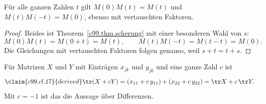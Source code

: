 \begin{fundament}[id=c99.f1,
    titel={Die Scherungen bilden eine Gruppe},
    wozu={Der Kern benutzt nur das Produkt zweier Scherungen; hier wird
      zusammengetragen, was daraus für die ganze Familie folgt.},
    voraussetzung={Kern~\ref{c99.s2.1}, Theorem~\ref{c99.thm.scherung}.},
    zurueck={Jede Scherung $M(t)$ lässt sich durch $M(-t)$ rückgängig machen.}]
  \begin{proposition}\label{c99.prop.gruppe}
    Für alle ganzen Zahlen $t$ gilt $M(0)M(t) = M(t)$ und $M(t)M(-t) = M(0)$,
    ebenso mit vertauschten Faktoren.
  \end{proposition}
  \begin{proof}
    Beides ist Theorem~\ref{c99.thm.scherung} mit einer besonderen Wahl von $s$:
    \begin{equation}\label{c99.eq.gruppe}
      M(0)M(t) = M(0 + t) = M(t),
      \qquad
      M(t)M(-t) = M(t - t) = M(0).
    \end{equation}
    Die Gleichungen mit vertauschten Faktoren folgen genauso, weil $s + t = t + s$.
  \end{proof}
\end{fundament}

\begin{fundament}[id=c99.f2,
    titel={Die Spur respektiert Summen},
    wozu={Die Vertiefung benutzt, dass die Spur einer Differenz die Differenz der
      Spuren ist; hier steht die Rechnung.},
    voraussetzung={\defref{T1}.},
    zurueck={Aus $\tr(AB) = \tr(BA)$ folgt deshalb $\tr(AB - BA) = 0$.}]
  Für Matrizen $X$ und $Y$ mit Einträgen $x_{jk}$ und $y_{jk}$ und eine ganze Zahl
  $c$ ist
  \begin{equation}\label{c99.eq.spur-linear}\claim{c99.cl.17}{derived}
    \tr(X + cY) = (x_{11} + c\,y_{11}) + (x_{22} + c\,y_{22})
                = \tr X + c\,\tr Y.
  \end{equation}
  Mit $c = -1$ ist das die Aussage über Differenzen.
\end{fundament}
